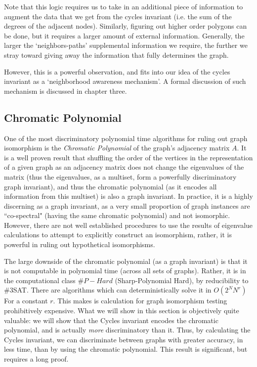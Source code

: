 Note that this logic requires us to take in an additional piece of information to augment the data that we get from the cycles invariant (i.e. the sum of the degrees of the adjacent nodes).
Similarly, figuring out higher order polygons can be done, but it requires a larger amount of external information.
Generally, the larger the `neighbors-paths' supplemental information we require, the further we stray toward giving away the information that fully determines the graph.

However, this is a powerful observation, and fits into our idea of the cycles invariant as a `neighborhood awareness mechanism'. A formal discussion of such mechanism is discussed in chapter three.

\subsection{Chromatic Polynomial}
One of the most discriminatory polynomial time algorithms for ruling out graph isomorphism is the \emph{Chromatic Polynomial} of the graph's adjacency matrix $A$.
It is a well proven result that shuffling the order of the vertices in the representation of a given graph as an adjacency matrix does not change the eigenvalues of the matrix (thus the eigenvalues, as a multiset, form a powerfully discriminatory graph invariant), and thus the chromatic polynomial (as it encodes all information from this multiset) is also a graph invariant.
In practice, it is a highly discerning as a graph invariant, as a very small proportion of graph instances are ``co-spectral" (having the same chromatic polynomial) and not isomorphic.
However, there are not well established procedures to use the results of eigenvalue calculations to attempt to explicitly construct an isomorphism, rather, it is powerful in ruling out hypothetical isomorphisms.

The large downside of the chromatic polynomial (as a graph invariant) is that it is not computable in polynomial time (across all sets of graphs).
Rather, it is in the computational class $\#P-Hard$ (Sharp-Polynomial Hard), by reducibility to \#3SAT.
There are algorithms which can deterministically solve it in $O(2^N N^r)$ For a constant $r$.
This makes is calculation for graph isomorphism testing prohibitively expensive.
What we will show in this section is objectively quite valuable: we will show that the Cycles invariant encodes the chromatic polynomial, and is actually \emph{more} discriminatory than it.
Thus, by calculating the Cycles invariant, we can discriminate between graphs with greater accuracy, in less time, than by using the chromatic polynomial. 
This result is significant, but requires a long proof.

